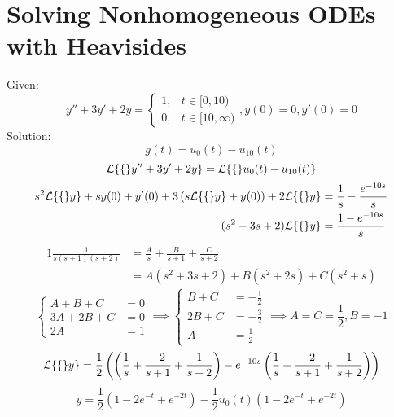 \documentclass[diffeq.tex]{subfiles}
\begin{document}
\section{Solving Nonhomogeneous ODEs with Heavisides}
\begin{homework*}[268.4]
    Given:
    \begin{equation}
        y'' + 3y' + 2y = \begin{cases}
            1, &t\in[0, 10)\\
            0, &t\in[10,\infty)
        \end{cases}, y(0) = 0, y'(0) = 0
    \end{equation}
    Solution:
    \begin{equation}
        g(t) = u_{0}(t) - u_{10}(t)
    \end{equation}
    \begin{equation}
        \mathcal{L}\{\{\}y'' + 3y' + 2y\} = \mathcal{L}\{\{\}u_{0}(t) - u_{10}(t)\}
    \end{equation}
    \begin{alignat}{1}
        s^{2}\mathcal{L}\{\{\}y\}+sy(0)+y'(0)+3\left(s\mathcal{L}\{\{\}y\}+y(0)\right) + 2\mathcal{L}\{\{\}y\} &= \frac{1}{s} - \frac{e^{-10s}}{s}\\
        (s^{2} + 3s + 2)\mathcal{L}\{\{\}y\} &= \frac{1 - e^{-10s}}{s}
    \end{alignat}
    \begin{alignat}{1}
        \frac{1}{s(s + 1)(s + 2)} &= \frac{A}{s} + \frac{B}{s + 1} + \frac{C}{s + 2}\\
        &= A(s^{2} + 3s + 2) + B(s^{2} + 2s) + C(s^{2} + s)
    \end{alignat}
    \begin{equation}
        \begin{cases}
            A + B + C &= 0\\
            3A + 2B + C &= 0\\
            2A &= 1
        \end{cases}
        \implies
        \begin{cases}
            B + C &= -\frac{1}{2}\\
            2B + C &= -\frac{3}{2}\\
            A &= \frac{1}{2}
        \end{cases}
        \implies
        A = C = \frac{1}{2}, B = -1
    \end{equation}
    \begin{equation}
        \mathcal{L}\{\{\}y\} = \frac{1}{2}\left(\left(\frac{1}{s} + \frac{-2}{s + 1} + \frac{1}{s + 2}\right) - e^{-10s}\left(\frac{1}{s} + \frac{-2}{s + 1} + \frac{1}{s + 2}\right)\right)
    \end{equation}
    \begin{equation}
        y = \frac{1}{2}\left(1 - 2e^{-t} + e^{-2t}\right) - \frac{1}{2}u_{0}(t)\left(1 - 2e^{-t} + e^{-2t}\right)
    \end{equation}
\end{homework*}
\end{document}
